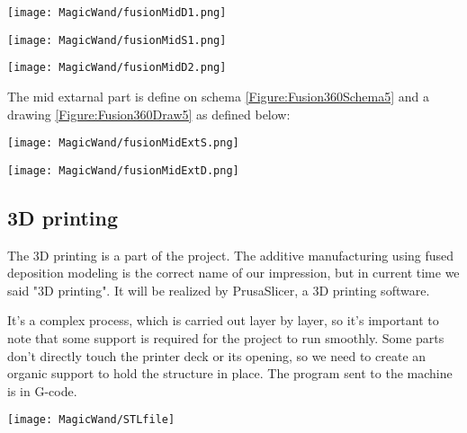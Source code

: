 \begin{center}
    \texttt{[image: MagicWand/fusionMidD1.png]}
     \label{Figure:Fusion360Draw3}	
\end{center}

\begin{center}
    \texttt{[image: MagicWand/fusionMidS1.png]}
     \label{Figure:Fusion360Schema4}	
\end{center}

\begin{center}
    \texttt{[image: MagicWand/fusionMidD2.png]}
     \label{Figure:Fusion360Draw4}	
\end{center}

The mid extarnal part is define on schema \ref{Figure:Fusion360Schema5} and a drawing \ref{Figure:Fusion360Draw5} as defined \cite{Fusion:2024d} below: 

\begin{center}
    \texttt{[image: MagicWand/fusionMidExtS.png]}
     \label{Figure:Fusion360Schema5}	
\end{center}

\begin{center}
    \texttt{[image: MagicWand/fusionMidExtD.png]}
     \label{Figure:Fusion360Draw5}	
\end{center}

\subsection{3D printing}

The 3D printing is a part of the project. The additive manufacturing using fused deposition modeling is the correct name of our impression, but in current time we said "3D printing". It will be realized by PrusaSlicer, a 3D printing software. 

It's a complex process, which is carried out layer by layer, so it's important to note that some support is required for the project to run smoothly. Some parts don't directly touch the printer deck or its opening, so we need to create an organic support to hold the structure in place. The program sent to the machine is in G-code. 

\begin{center}
    \texttt{[image: MagicWand/STLfile]}
\end{center}

